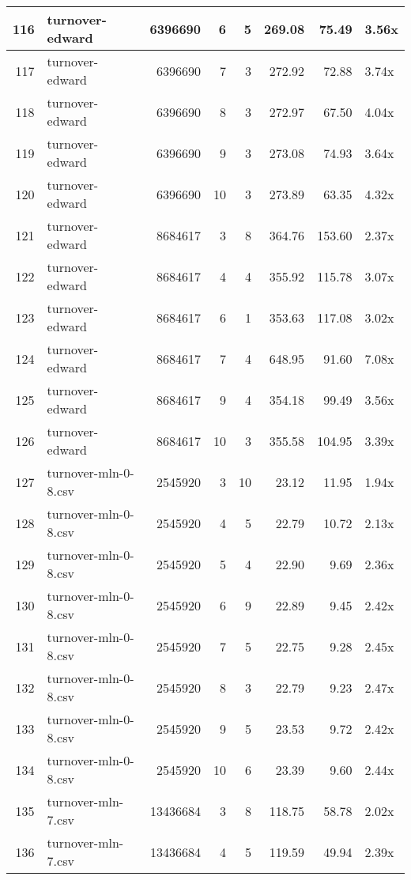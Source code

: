 \begin{table}[ht]
\begin{tabular}{rlrrrrrl}
   \hline
116 & turnover-edward & 6396690 &   6 &   5 & 269.08 & 75.49 & 3.56x \\ 
   \hline
117 & turnover-edward & 6396690 &   7 &   3 & 272.92 & 72.88 & 3.74x \\ 
   \hline
118 & turnover-edward & 6396690 &   8 &   3 & 272.97 & 67.50 & 4.04x \\ 
   \hline
119 & turnover-edward & 6396690 &   9 &   3 & 273.08 & 74.93 & 3.64x \\ 
   \hline
120 & turnover-edward & 6396690 &  10 &   3 & 273.89 & 63.35 & 4.32x \\ 
   \hline
121 & turnover-edward & 8684617 &   3 &   8 & 364.76 & 153.60 & 2.37x \\ 
   \hline
122 & turnover-edward & 8684617 &   4 &   4 & 355.92 & 115.78 & 3.07x \\ 
   \hline
123 & turnover-edward & 8684617 &   6 &   1 & 353.63 & 117.08 & 3.02x \\ 
   \hline
124 & turnover-edward & 8684617 &   7 &   4 & 648.95 & 91.60 & 7.08x \\ 
   \hline
125 & turnover-edward & 8684617 &   9 &   4 & 354.18 & 99.49 & 3.56x \\ 
   \hline
126 & turnover-edward & 8684617 &  10 &   3 & 355.58 & 104.95 & 3.39x \\ 
   \hline
127 & turnover-mln-0-8.csv & 2545920 &   3 &  10 & 23.12 & 11.95 & 1.94x \\ 
   \hline
128 & turnover-mln-0-8.csv & 2545920 &   4 &   5 & 22.79 & 10.72 & 2.13x \\ 
   \hline
129 & turnover-mln-0-8.csv & 2545920 &   5 &   4 & 22.90 & 9.69 & 2.36x \\ 
   \hline
130 & turnover-mln-0-8.csv & 2545920 &   6 &   9 & 22.89 & 9.45 & 2.42x \\ 
   \hline
131 & turnover-mln-0-8.csv & 2545920 &   7 &   5 & 22.75 & 9.28 & 2.45x \\ 
   \hline
132 & turnover-mln-0-8.csv & 2545920 &   8 &   3 & 22.79 & 9.23 & 2.47x \\ 
   \hline
133 & turnover-mln-0-8.csv & 2545920 &   9 &   5 & 23.53 & 9.72 & 2.42x \\ 
   \hline
134 & turnover-mln-0-8.csv & 2545920 &  10 &   6 & 23.39 & 9.60 & 2.44x \\ 
   \hline
135 & turnover-mln-7.csv & 13436684 &   3 &   8 & 118.75 & 58.78 & 2.02x \\ 
   \hline
136 & turnover-mln-7.csv & 13436684 &   4 &   5 & 119.59 & 49.94 & 2.39x \\ 

\end{tabular}
\end{table}
